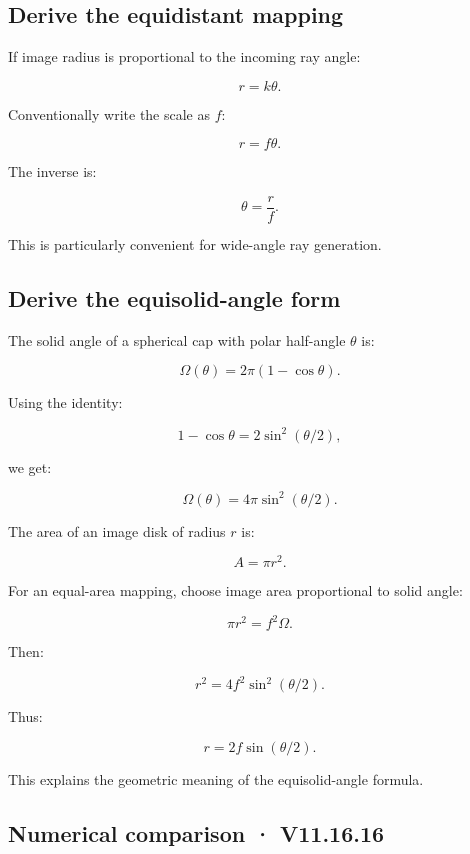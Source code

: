 \subsection{Derive the equidistant mapping}\label{02-foundations-ii-ch035-derive-the-equidistant-mapping}

If image radius is proportional to the incoming ray angle:

\[ r=k\theta. \]

Conventionally write the scale as \(f\):

\[ \boxed{r=f\theta}. \]

The inverse is:

\[ \boxed{\theta=\frac rf}. \]

This is particularly convenient for wide-angle ray generation.

\subsection{Derive the equisolid-angle form}\label{02-foundations-ii-ch035-derive-the-equisolid-angle-form}

The solid angle of a spherical cap with polar half-angle \(\theta\) is:

\[ \boxed{ \Omega(\theta)=2\pi(1-\cos\theta). } \]

Using the identity:

\[ 1-\cos\theta=2\sin^2(\theta/2), \]

we get:

\[ \Omega(\theta)=4\pi\sin^2(\theta/2). \]

The area of an image disk of radius \(r\) is:

\[ A=\pi r^2. \]

For an equal-area mapping, choose image area proportional to solid angle:

\[ \pi r^2=f^2\Omega. \]

Then:

\[ r^2=4f^2\sin^2(\theta/2). \]

Thus:

\[ \boxed{ r=2f\sin(\theta/2). } \]

This explains the geometric meaning of the equisolid-angle formula.

\subsection{Numerical comparison · V11.16.16}\label{02-foundations-ii-ch035-numerical-comparison-v11.16.16}

